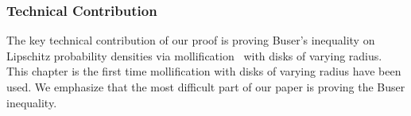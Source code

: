 % 
%     
% 

\subsubsection{Technical Contribution}
The key technical contribution of our proof is proving Buser's
inequality on Lipschitz probability densities via
mollification~\cite{s38, f44} with disks of varying radius. 
This chapter is the first time mollification with disks of varying radius
have been used. We emphasize that the most difficult part of our paper
is proving the Buser inequality.

